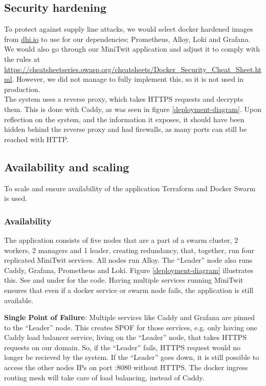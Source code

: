 \subsection{Security hardening}\label{security-hardening}
To protect against supply line attacks, we would select docker hardened images from \url{dhi.io} to use for our dependencies; Prometheus, Alloy, Loki and Grafana.
We would also go through our MiniTwit application and adjust it to comply with the rules at \url{https://cheatsheetseries.owasp.org/cheatsheets/Docker_Security_Cheat_Sheet.html}.
However, we did not manage to fully implement this, so it is not used in production. \\

The system uses a reverse proxy, which takes HTTPS requests and decrypts them.
This is done with Caddy, as was seen in figure \ref{deployment-diagram}.
Upon reflection on the system, and the information it exposes, it should have been hidden behind the reverse proxy and had firewalls, as many ports can still be reached with HTTP.

\subsection{Availability and scaling}\label{availability-and-scaling}
To scale and ensure availability of the application Terraform and Docker
Swarm is used.

\subsubsection{Availability}\label{availability}
The application consists of five nodes that are a part of a swarm
cluster, 2 workers, 2 managers and 1 leader, creating redundancy, that, together, run four replicated MiniTwit services.
All nodes run Alloy.
The ``Leader'' node also runs Caddy, Grafana, Prometheus and Loki.
Figure \ref{deployment-diagram} illustrates this.
\sloppy See
 and
 under
 for the code. Having multiple services running MiniTwit ensures that even if a docker service or swarm node
fails, the application is still available.

\textbf{Single Point of Failure}: Multiple services like Caddy and Grafana are pinned to the ``Leader'' node. 
This creates SPOF for those services, e.g. only having one Caddy load balancer service,
living on the ``Leader'' node, that takes HTTPS requests on our  domain. So, if the ``Leader'' 
fails,  HTTPS request would no longer be recieved by the system. 
If the ``Leader'' goes down, it is still possible to access the other nodes
IPs on port :8080 without HTTPS. The docker ingress routing mesh
will take care of load balancing, instead of Caddy.


